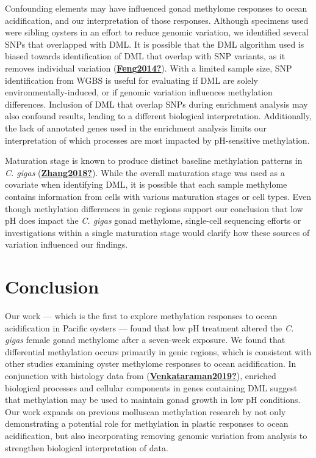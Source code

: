\documentclass [11pt, proquest] {uwthesis}[2015/03/03]
\begin{document}
Confounding elements may have influenced gonad methylome responses to ocean acidification, and our interpretation of those responses. Although specimens used were sibling oysters in an effort to reduce genomic variation, we identified several SNPs that overlapped with DML. It is possible that the DML algorithm used is biased towards identification of DML that overlap with SNP variants, as it removes individual variation (\protect\hyperlink{ref-Feng2014}{\textbf{Feng2014?}}). With a limited sample size, SNP identification from WGBS is useful for evaluating if DML are solely environmentally-induced, or if genomic variation influences methylation differences. Inclusion of DML that overlap SNPs during enrichment analysis may also confound results, leading to a different biological interpretation. Additionally, the lack of annotated genes used in the enrichment analysis limits our interpretation of which processes are most impacted by pH-sensitive methylation.

Maturation stage is known to produce distinct baseline methylation patterns in \emph{C. gigas} (\protect\hyperlink{ref-Zhang2018}{\textbf{Zhang2018?}}). While the overall maturation stage was used as a covariate when identifying DML, it is possible that each sample methylome contains information from cells with various maturation stages or cell types. Even though methylation differences in genic regions support our conclusion that low pH does impact the \emph{C. gigas} gonad methylome, single-cell sequencing efforts or investigations within a single maturation stage would clarify how these sources of variation influenced our findings.

\hypertarget{conclusion-2}{%
\section{Conclusion}\label{conclusion-2}}

Our work --- which is the first to explore methylation responses to ocean acidification in Pacific oysters --- found that low pH treatment altered the \emph{C. gigas} female gonad methylome after a seven-week exposure. We found that differential methylation occurs primarily in genic regions, which is consistent with other studies examining oyster methylome responses to ocean acidification. In conjunction with histology data from (\protect\hyperlink{ref-Venkataraman2019}{\textbf{Venkataraman2019?}}), enriched biological processes and cellular components in genes containing DML suggest that methylation may be used to maintain gonad growth in low pH conditions. Our work expands on previous molluscan methylation research by not only demonstrating a potential role for methylation in plastic responses to ocean acidification, but also incorporating removing genomic variation from analysis to strengthen biological interpretation of data.
\end{document}
